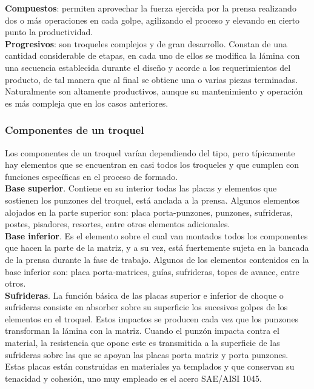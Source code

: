 \textbf{Compuestos}: permiten aprovechar la fuerza ejercida por la prensa realizando dos 
o más operaciones en cada golpe, agilizando el proceso y elevando en cierto punto 
la productividad.\\

\textbf{Progresivos}: son troqueles complejos y de gran desarrollo. Constan de una 
cantidad considerable de etapas, en cada uno de ellos se modifica la lámina con una secuencia 
establecida durante el diseño y acorde a los requerimientos del producto, de tal manera 
que al final se obtiene una o varias piezas terminadas. Naturalmente son altamente productivos, 
aunque su mantenimiento y operación es más compleja que en los casos anteriores.

\subsubsection{Componentes de un troquel}

Los componentes de un troquel varían dependiendo del tipo, pero típicamente hay elementos 
que se encuentran en casi todos los troqueles y que cumplen con funciones específicas 
en el proceso de formado.\\

\textbf{Base superior}. Contiene en su interior todas las placas y elementos que sostienen 
los punzones del troquel, está anclada a la prensa. Algunos elementos alojados en 
la parte superior son: placa porta-punzones, punzones, sufrideras, postes, pisadores, resortes, 
entre otros elementos adicionales.\\

\textbf{Base inferior}. Es el elemento sobre el cual van montados todos los componentes 
que hacen la parte de la matriz, y a su vez, está fuertemente sujeta en la bancada 
de la prensa durante la fase de trabajo. Algunos de los elementos contenidos en 
la base inferior son: placa  porta-matrices, guías, sufrideras, topes de avance, entre 
otros.\\

\textbf{Sufrideras}. La función básica de las placas superior e inferior de choque o sufrideras 
consiste en absorber sobre su superficie los sucesivos golpes de los elementos en el troquel. 
Estos impactos se producen cada vez que los punzones transforman la lámina con la matriz. Cuando 
el punzón impacta contra el material, la resistencia que opone este es transmitida a la 
superficie de las sufrideras sobre las que se apoyan las placas porta matriz y porta punzones. 
Estas placas están construidas en materiales ya templados y que conservan su tenacidad y cohesión, 
uno muy empleado es el acero SAE/AISI 1045.\\


